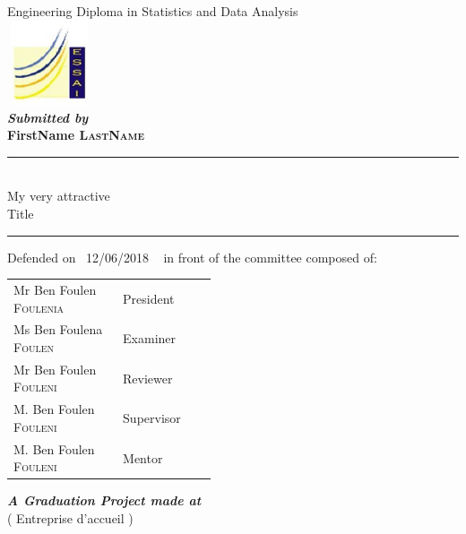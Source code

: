 \documentclass[a4paper, oneside, french, 12pt, final]{extreport}
\newcommand{\reportAuthor} {%
  FirstName \textsc{LastName}%
}
\newcommand{\reportSubject} {%
  My very attractive \\ Title%
}
\newcommand{\dateSoutenance} {%
  12/06/2018%
}
\newcommand{\studyDepartment} {%
  Entreprise d'accueil %
}
\newcommand{\juryPresident} {%
  Mr Ben Foulen \textsc{Foulenia}%
}
\newcommand{\juryPresidentDesc} {%
  President%
}
\newcommand{\juryMemberOne} {%
  Ms Ben Foulena \textsc{Foulen}%
}
\newcommand{\juryMemberOneDesc} {%
  Examiner %
}
\newcommand{\juryMemberTwo} {%
  Mr Ben Foulen \textsc{Fouleni}%
}
\newcommand{\juryMemberTwoDesc} {%
  Reviewer%
}
\newcommand{\juryMemberThree} {%
	M. Ben Foulen \textsc{Fouleni}%
}
\newcommand{\juryMemberThreeDesc} {%
	Supervisor%
}
\newcommand{\juryMemberFour} {%
	M. Ben Foulen \textsc{Fouleni}%
}
\newcommand{\juryMemberFourDesc} {%
	Mentor%
}
\begin{document}
\begin{titlepage}
\begin{center}
\vspace{10pt}
Engineering Diploma in Statistics and Data Analysis\\

\includegraphics[width=2.5cm, height=2.5cm]{logo-essai.jpg}\\

\vspace{10pt}
\textbf{\textit{Submitted by}}\\
\vspace{10pt} {%
  \fontsize{18pt}{18pt}\selectfont%
  \textbf{\reportAuthor}\\
}%

\vspace{10pt} {%
  \renewcommand*{\familydefault}{\defaultFont}
  \fontsize{27pt}{27pt}\selectfont%
  \rule{0.5\textwidth}{.4pt}\\
  \vspace{10pt}
  \reportSubject{}\\%
  \vspace{10pt}
  \rule{0.5\textwidth}{.4pt}
}

\vspace{10pt}
Defended on~\dateSoutenance~ in front of the committee composed of:\\
\vspace{20pt}
\begin{tabular}{p{0.3\linewidth} p{0.15\linewidth}}
  \juryPresident{} & \juryPresidentDesc{}\\
  \juryMemberOne{} & \juryMemberOneDesc{}\\
  \juryMemberTwo{} & \juryMemberTwoDesc{}\\
  \juryMemberThree{} & \juryMemberThreeDesc{}\\
  \juryMemberFour{} & \juryMemberFourDesc{}\\
\end{tabular}

\vspace{10pt}%
\textbf{\textit{A Graduation Project made at}}\\

\vspace{10pt}
(\studyDepartment)\\

\end{center}
\end{titlepage}
\end{document}
